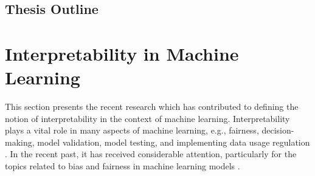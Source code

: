 \documentclass[english]{tktltiki2}
\theoremstyle{definition}
\theoremstyle{remark}
\begin{document}
\subsection{Thesis Outline} %


\section{Interpretability in Machine Learning}\label{sec:interpretability_in_ML} %

This section presents the recent research which has contributed to defining the notion of interpretability in the context of machine learning. Interpretability plays a vital role in many aspects of machine learning, e.g., fairness, decision-making, model validation, model testing, and implementing data usage regulation \citep{guidotti2018survey, zhang2019machine}. In the recent past, it has received considerable attention, particularly for the topics related to bias and fairness in machine learning models \citep{cathy2017weapons, molnarinterpretable}.
\end{document}
